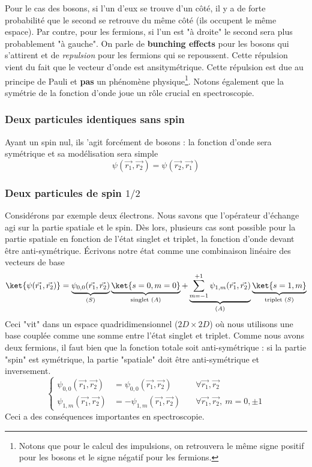 Pour le cas des bosons, si l'un d'eux se trouve d'un côté, il y a de forte probabilité que le second se retrouve 
du même côté (ils occupent le même espace). Par contre, pour les fermions, si l'un est "à droite" le second 
sera plus probablement "à gauche". On parle de \textbf{bunching effects}  pour les bosons qui s'attirent et de 
\textit{repulsion} pour les fermions qui se repoussent. Cette répulsion vient du fait que le vecteur d'onde est 
ansitymétrique. Cette répulsion est due au principe de Pauli et \textbf{pas} un phénomène physique\footnote{Notons 
que pour le calcul des impulsions, on retrouvera le même signe positif pour les bosons et le signe négatif pour 
les fermions.}. Notons également que la symétrie de la fonction d'onde joue un rôle crucial en spectroscopie.



\subsubsection{Deux particules identiques sans spin}
Ayant un spin nul, ils 'agit forcément de bosons : la fonction d'onde sera symétrique et sa modélisation sera simple
\begin{equation}
\psi(\vec{r_1},\vec{r_2}) =\psi(\vec{r_2},\vec{r_1}) 
\end{equation}

 
\subsubsection{Deux particules de spin $1/2$}
Considérons par exemple deux électrons. Nous savons que l'opérateur d'échange agi sur la partie spatiale et le spin. Dès 
lors, plusieurs cas sont possible pour la partie spatiale en fonction de l'état singlet et triplet, la fonction d'onde devant 
être anti-symétrique. Écrivons notre état comme une combinaison linéaire des vecteurs de base
\begin{equation}
\ket{\psi(\vec{r_1},\vec{r_2})} = \underbrace{\psi_{0,0}(\vec{r_1},\vec{r_2})}_{(S)}\underbrace{\ket{s=0,m=0}}_{\text{singlet } (A)} + \underbrace{\sum_{m=-1}^{+1} \psi_{1,m}(\vec{r_1},\vec{r_2})}_{(A)}\underbrace{\ket{s=1,m}}_{\text{triplet } (S)}
\end{equation}
Ceci "vit" dans un espace quadridimensionnel ($2D\times2D$) où nous utilisons une base couplée comme une somme entre l'état 
singlet et triplet. Comme nous avons deux fermions, il faut bien que la fonction totale soit anti-symétrique : si la partie 
"spin" est symétrique, la partie "spatiale" doit être anti-symétrique et inversement.
\begin{equation}
\left\{\begin{array}{lll}
\psi_{0,0}(\vec{r_1},\vec{r_2}) &=\psi_{0,0}(\vec{r_1},\vec{r_2})&\quad \forall \vec{r_1},\vec{r_2}\\
\psi_{1,m}(\vec{r_1},\vec{r_2}) &=-\psi_{1,m}(\vec{r_1},\vec{r_2})&\quad \forall \vec{r_1},\vec{r_2},\ m=0,\pm1
\end{array}\right.
\end{equation}
Ceci a des conséquences importantes en spectroscopie.

